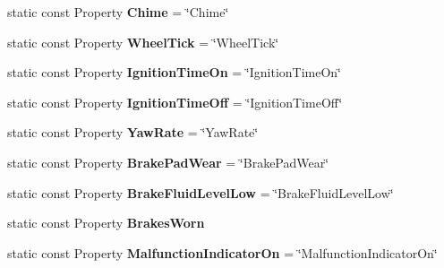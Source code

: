\begin{DoxyCompactItemize}
\item 
\hypertarget{classVehicleProperty_a74dba6e3a42c35d27b95307fb48fc811}{static const Property {\bfseries Chime} = \char`\"{}Chime\char`\"{}}\label{classVehicleProperty_a74dba6e3a42c35d27b95307fb48fc811}

\item 
\hypertarget{classVehicleProperty_a7a03fc8cb6f88571cc560cc4d2978604}{static const Property {\bfseries Wheel\+Tick} = \char`\"{}Wheel\+Tick\char`\"{}}\label{classVehicleProperty_a7a03fc8cb6f88571cc560cc4d2978604}

\item 
\hypertarget{classVehicleProperty_ae4f984a84f7a2cbf0199fcd86d0bdc6a}{static const Property {\bfseries Ignition\+Time\+On} = \char`\"{}Ignition\+Time\+On\char`\"{}}\label{classVehicleProperty_ae4f984a84f7a2cbf0199fcd86d0bdc6a}

\item 
\hypertarget{classVehicleProperty_a9c6e164bef0421d84d8b002435ebdc82}{static const Property {\bfseries Ignition\+Time\+Off} = \char`\"{}Ignition\+Time\+Off\char`\"{}}\label{classVehicleProperty_a9c6e164bef0421d84d8b002435ebdc82}

\item 
\hypertarget{classVehicleProperty_a41ac055b62c2b92fc777e9c5c97b9e56}{static const Property {\bfseries Yaw\+Rate} = \char`\"{}Yaw\+Rate\char`\"{}}\label{classVehicleProperty_a41ac055b62c2b92fc777e9c5c97b9e56}

\item 
\hypertarget{classVehicleProperty_a6515a62f474fd024c9267607de2687d6}{static const Property {\bfseries Brake\+Pad\+Wear} = \char`\"{}Brake\+Pad\+Wear\char`\"{}}\label{classVehicleProperty_a6515a62f474fd024c9267607de2687d6}

\item 
\hypertarget{classVehicleProperty_ad6cf319ced32e0dc25d28f65d07e7af3}{static const Property {\bfseries Brake\+Fluid\+Level\+Low} = \char`\"{}Brake\+Fluid\+Level\+Low\char`\"{}}\label{classVehicleProperty_ad6cf319ced32e0dc25d28f65d07e7af3}

\item 
\hypertarget{classVehicleProperty_ab003ec60d6e57b04eeb3a9bc953115cd}{static const Property {\bfseries Brakes\+Worn}}\label{classVehicleProperty_ab003ec60d6e57b04eeb3a9bc953115cd}

\item 
\hypertarget{classVehicleProperty_aae0b4bdb4022ef212b77edfe904080e8}{static const Property {\bfseries Malfunction\+Indicator\+On} = \char`\"{}Malfunction\+Indicator\+On\char`\"{}}\label{classVehicleProperty_aae0b4bdb4022ef212b77edfe904080e8}


\end{DoxyCompactItemize}
